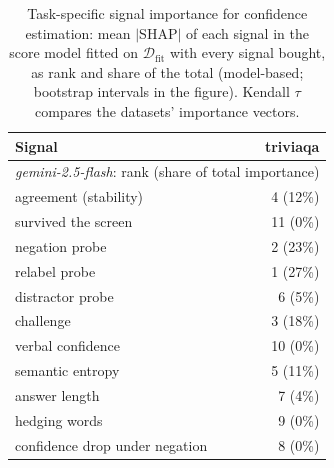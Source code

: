 \begin{table}[t]
\centering
\small
\begin{tabular}{lr}
\toprule
Signal & triviaqa \\
\midrule
\multicolumn{2}{l}{\emph{gemini-2.5-flash}: rank (share of total importance)} \\
agreement (stability) & 4 (12\%) \\
survived the screen & 11 (0\%) \\
negation probe & 2 (23\%) \\
relabel probe & 1 (27\%) \\
distractor probe & 6 (5\%) \\
challenge & 3 (18\%) \\
verbal confidence & 10 (0\%) \\
semantic entropy & 5 (11\%) \\
answer length & 7 (4\%) \\
hedging words & 9 (0\%) \\
confidence drop under negation & 8 (0\%) \\
\bottomrule
\end{tabular}
\caption{Task-specific signal importance for confidence estimation: mean $|$SHAP$|$ of each signal in the score model fitted on $\mathcal{D}_{\mathrm{fit}}$ with every signal bought, as rank and share of the total (model-based; bootstrap intervals in the figure). Kendall $\tau$ compares the datasets' importance vectors.}
\label{tab:signal-importance}
\end{table}
